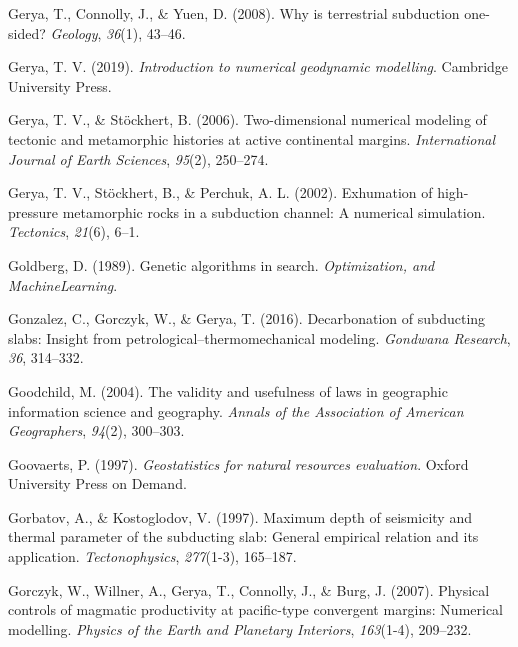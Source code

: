\begin{CSLReferences}{1}{1}
\leavevmode{}%
Gerya, T., Connolly, J., \& Yuen, D. (2008). Why is terrestrial subduction one-sided? \emph{Geology}, \emph{36}(1), 43--46.

\leavevmode{}%
Gerya, T. V. (2019). \emph{Introduction to numerical geodynamic modelling}. Cambridge University Press.

\leavevmode{}%
Gerya, T. V., \& Stöckhert, B. (2006). Two-dimensional numerical modeling of tectonic and metamorphic histories at active continental margins. \emph{International Journal of Earth Sciences}, \emph{95}(2), 250--274.

\leavevmode{}%
Gerya, T. V., Stöckhert, B., \& Perchuk, A. L. (2002). Exhumation of high-pressure metamorphic rocks in a subduction channel: A numerical simulation. \emph{Tectonics}, \emph{21}(6), 6--1.

\leavevmode{}%
Goldberg, D. (1989). Genetic algorithms in search. \emph{Optimization, and MachineLearning}.

\leavevmode{}%
Gonzalez, C., Gorczyk, W., \& Gerya, T. (2016). Decarbonation of subducting slabs: Insight from petrological--thermomechanical modeling. \emph{Gondwana Research}, \emph{36}, 314--332.

\leavevmode{}%
Goodchild, M. (2004). The validity and usefulness of laws in geographic information science and geography. \emph{Annals of the Association of American Geographers}, \emph{94}(2), 300--303.

\leavevmode{}%
Goovaerts, P. (1997). \emph{Geostatistics for natural resources evaluation}. Oxford University Press on Demand.

\leavevmode{}%
Gorbatov, A., \& Kostoglodov, V. (1997). Maximum depth of seismicity and thermal parameter of the subducting slab: General empirical relation and its application. \emph{Tectonophysics}, \emph{277}(1-3), 165--187.

\leavevmode{}%
Gorczyk, W., Willner, A., Gerya, T., Connolly, J., \& Burg, J. (2007). Physical controls of magmatic productivity at pacific-type convergent margins: Numerical modelling. \emph{Physics of the Earth and Planetary Interiors}, \emph{163}(1-4), 209--232.


\end{CSLReferences}
